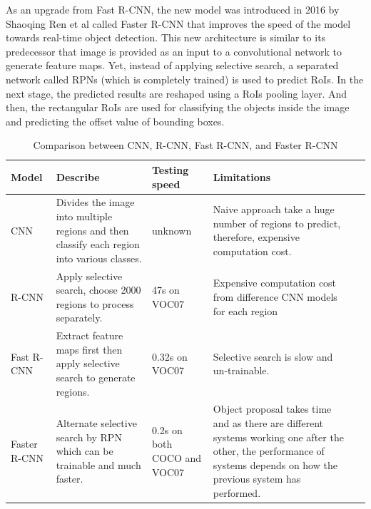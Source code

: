 	As an upgrade from Fast R-CNN, the new model was introduced in 2016 by Shaoqing Ren et al called Faster R-CNN that improves the speed of the model towards real-time object detection. This new architecture is similar to its predecessor that image is provided as an input to a convolutional network to generate feature maps. Yet, instead of applying selective search, a separated network called RPNs (which is completely trained) is used to predict RoIs. In the next stage, the predicted results are reshaped using a RoIs pooling layer. And then, the rectangular RoIs are used for classifying the objects inside the image and predicting the offset value of bounding boxes.
	
	\begin{table}
		\begin{tabularx}{1\textwidth} {
				| >{\raggedright\arraybackslash}X 
				| >{\raggedright\arraybackslash}X
				| >{\raggedright\arraybackslash}X 
				| >{\raggedright\arraybackslash}X  
				| >{\raggedright\arraybackslash}X | }
			\hline
			Model & Describe & Testing speed & Limitations \\
			\hline
			CNN & Divides the image into multiple regions and then classify each region into various classes.  & unknown & Naive approach take a huge number of regions to predict, therefore, expensive computation cost. \\
			\hline
			R-CNN & Apply selective search, choose 2000 regions to process separately.  & 47s on VOC07 & Expensive computation cost from difference CNN models for each region \\
			\hline
			Fast R-CNN & Extract feature maps first then apply selective search to generate regions.  & 0.32s on VOC07 & Selective search is slow and un-trainable. \\
			\hline
			Faster R-CNN & Alternate selective search by RPN which can be trainable and much faster.  & 0.2s on both COCO and VOC07 & Object proposal takes time and as there are different systems working one after the other, the performance of systems depends on how the previous system has performed. \\
			\hline
		\end{tabularx}
		\caption{Comparison between CNN, R-CNN, Fast R-CNN, and Faster R-CNN}
		\label{bang1}
	
	\end{table}
%		
	
